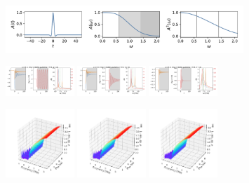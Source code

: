 \documentclass[a4paper]{article}
\begin{document}
\begin{figure}[H]
  \centering
  \includegraphics[width=0.8\textwidth]{A0.pdf}
\end{figure}
\begin{figure}[H]
  \centering
  \includegraphics[width=0.23\textwidth]{HL-A0-v0-imp0.pdf}
  \includegraphics[width=0.23\textwidth]{HL-A0-v1-imp0.pdf}
  \includegraphics[width=0.23\textwidth]{HL-A0-v2-imp0.pdf}
\end{figure}
\begin{figure}[H]
  \centering
  \includegraphics[width=0.23\textwidth]{cond3d_real-A0-v0-imp0.pdf}
  \includegraphics[width=0.23\textwidth]{cond3d_real-A0-v1-imp0.pdf}
  \includegraphics[width=0.23\textwidth]{cond3d_real-A0-v2-imp0.pdf}
\end{figure}
\end{document}
